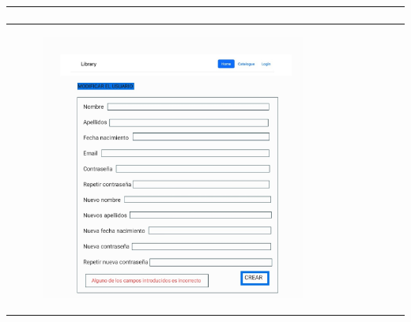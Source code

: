 \documentclass{report}
\begin{document}
\begin{center}
\begin{longtable}{|p{\linewidth}|}
\begin{figure}[H]
                    \end{figure}\\
                    \hline
                    \begin{figure}[H]
                        \centering
                        \includegraphics[width=0.8\textwidth]{./img/grafico/ErrorModificarUsu.jpg}
                    \end{figure}\\
                    \hline
            \end{longtable}
        \end{center}
        \clearpage
\end{document}
